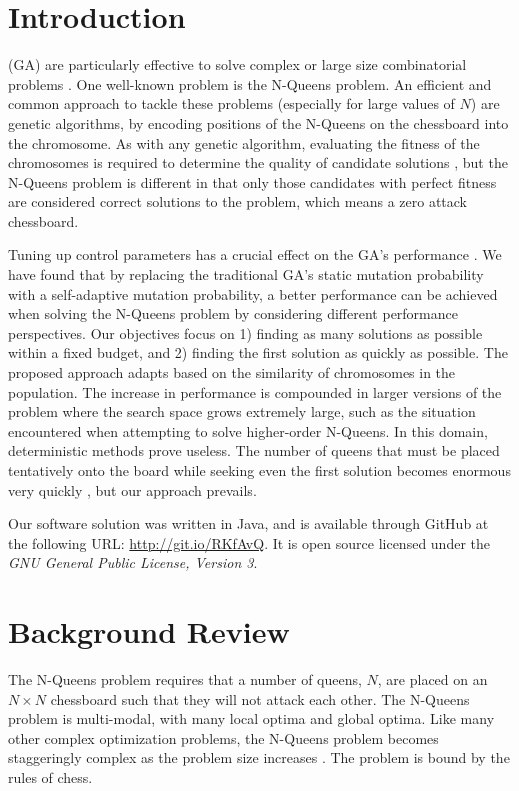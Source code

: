 \documentclass[conference]{IEEEtran}
\begin{document}

\section{Introduction}
 (GA) are particularly effective to solve complex or large size combinatorial problems \cite{cit:1,cit:2}. One well-known problem is the N-Queens problem. An efficient and common approach to tackle these problems (especially for large values of $N$) are genetic algorithms, by encoding positions of the N-Queens on the chessboard into the chromosome. As with any genetic algorithm, evaluating the fitness of the chromosomes is required to determine the quality of candidate solutions \cite{cit:8}, but the N-Queens problem is different in that only those candidates with perfect fitness are considered correct solutions to the problem, which means a zero attack chessboard. 

Tuning up control parameters has a crucial effect on the GA's performance \cite{cit:12,cit:13,cit:15,cit:7}. We have found that by replacing the traditional GA's static mutation probability with a self-adaptive mutation probability, a better performance can be achieved when solving the N-Queens problem by considering different performance perspectives. Our objectives focus on 1) finding as many solutions as possible within a fixed budget, and 2) finding the first solution as quickly as possible. The proposed approach adapts based on the similarity of chromosomes in the population. The increase in performance is compounded in larger versions of the problem where the search space grows extremely large, such as the situation encountered when attempting to solve higher-order N-Queens. In this domain, deterministic methods prove useless. The number of queens that must be placed tentatively onto the board while seeking even the first solution becomes enormous very quickly \cite{cit:21}, but our approach prevails.

Our software solution was written in Java, and is available through GitHub at the following URL: \url{http://git.io/RKfAvQ}. It is open source licensed under the \textit{GNU General Public License, Version 3}.

\section{Background Review}
The N-Queens problem requires that a number of queens, $N$, are placed on an $N \times N$ chessboard such that they will not attack each other. The N-Queens problem is multi-modal, with many local optima and global optima. Like many other complex optimization problems, the N-Queens problem becomes staggeringly complex as the problem size increases \cite{cit:3}. The problem is bound by the rules of chess. 
\end{document}
